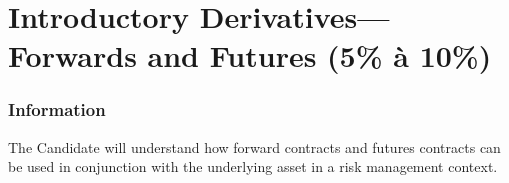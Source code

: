 \chapter[Introductory Derivatives---Forwards and Futures]{Introductory Derivatives---Forwards and Futures (5\% à 10\%)}

\subsection{Information}

\begin{distributions}[Objective]
The Candidate will understand how forward contracts and futures contracts can be used in conjunction with the underlying asset in a risk management context.
\end{distributions}


